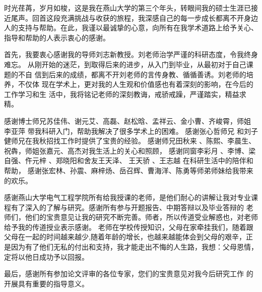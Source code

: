 \makeatletter
{}
  \pagestyle{fancy}%
  \fancyhf{}
\makeatother

\begin{thanks}
\begin{comment}
\end{comment}
时光荏苒，岁月如梭，这是我在燕山大学的第三个年头，转眼间我的硕士生涯已接近尾声。回首这段充满挑战与收获的旅程，我深感自己的每一步成长都离不开身边人的支持与帮助。在此，我谨以最诚挚的心意，向所有在我学术道路上给予关心、指导和帮助的人表示衷心的感谢。

首先，我要衷心感谢我的导师刘志新教授。刘老师治学严谨的科研态度，令我终身难忘。
从刚开始的迷茫，到取得后来的进步，从入门到毕业，从最初对于自己课题的不自
信到后来的成绩，都离不开刘老师的言传身教、循循善诱。刘老师的培养，不仅体
现在学术上，更对我的人生观和价值感也有着深刻的影响，在今后的工作学习和生
活中，我将铭记老师的深刻教诲，戒骄戒躁，严谨踏实，精益求精。

 感谢博士师兄苏佳伟、谢元艾、高磊、赵松晗、孟祥云、金小曹、齐峻霄，师姐 李亚萍 带我科研入门，帮助我解决了很多学术上的困难。
 感谢张心哲师兄  和刘子健师兄在我秋招找工作时提供了宝贵的经验。
 感谢师兄田秋来 、陈熙、李晨生、祝犇，师姐张嘉元、高杰对我生活上的关心和照顾，
 感谢同窗李彩月 、李博、梁自强、仵元梓 、郑晓阳和舍友王天泽、 王天骄 、王志越  在科研生活中的陪伴和帮助，%
 感谢张宏林、孙震、麻梓炀、岳召辉、曹海洋、陈勇等师弟师妹给我带来的欢乐。

 感谢燕山大学电气工程学院所有给我授课的老师，是他们耐心的讲解让我对专业课程有了深入的了解与研究。感谢所有参与开题报告、中期答辩以及毕业答辩的
老师们，他们的宝贵意见让我的研究不断完善。师者，所以传道受业解惑也，对老师给予我的传道授业表示感谢。
老师在学校传授知识，父母在家牵挂我们，随着跟父母在一起的时间越来越少,随着年龄的增长，也越来越能体会到父母的艰辛，正是因为有了他们无私的付出和支持，我才能走出不悔的人生路，我想：父母恩情，定将以他日成功予以回报。

最后，感谢所有参加论文评审的各位专家，您们的宝贵意见对我今后研究工作
的开展具有重要的指导意义。


\end{thanks}
